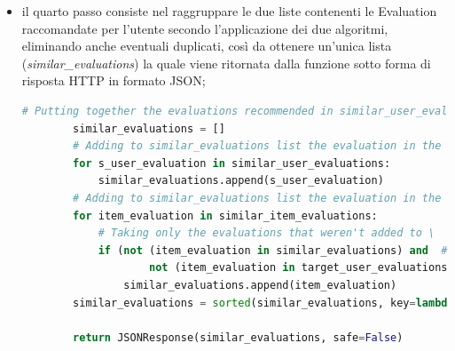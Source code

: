 \begin{itemize}
\begin{lstlisting}[language=Python, label=lst:CF_Hybrid_Evaluation_4]
                # Taking only the evaluations that have: different other_id (excluding the target evaluation
                # in the recommendation) and same parent_id and the evaluations that weren't added to 'similar_item_evaluations'
                # list or to 'similar_user_evaluations' or to 'target_user_evaluations'
                if ((t_user_evaluation['other_id'] != item_evaluation['other_id']) and # Evaluations must have different 'id'
                        (t_user_evaluation['parent_id'] == item_evaluation['parent_id']) and # Evaluations must have the same 'parent_id'
                        # Evaluation in all_other_evals list mustn't be already added to \
                        not (item_evaluation in similar_item_evaluations) and # the 'similar_item_evaluations' list,
                        not (item_evaluation in similar_user_evaluations) and # the 'similar_user_evaluations' list or
                        not (item_evaluation in target_user_evaluations)): # the 'target_user_evaluations' list
                    similar_item_evaluations.append(item_evaluation)
    \end{lstlisting} 
    \item il quarto passo consiste nel raggruppare le due liste contenenti le Evaluation raccomandate per l'utente secondo l'applicazione dei 
    due algoritmi, eliminando anche eventuali duplicati, così da ottenere un'unica lista (\textit{similar\_evaluations}) la quale viene ritornata dalla 
    funzione sotto forma di risposta HTTP in formato JSON;
    \begin{lstlisting}[language=Python, label=lst:CF_Hybrid_Evaluation_5]
        # Putting together the evaluations recommended in similar_user_evaluations list and similar_item_evaluations list
        similar_evaluations = []
        # Adding to similar_evaluations list the evaluation in the similar_user_evaluations list
        for s_user_evaluation in similar_user_evaluations:
            similar_evaluations.append(s_user_evaluation)
        # Adding to similar_evaluations list the evaluation in the similar_item_evaluations list
        for item_evaluation in similar_item_evaluations:
            # Taking only the evaluations that weren't added to \
            if (not (item_evaluation in similar_evaluations) and  # the 'similar_evaluations' list or
                    not (item_evaluation in target_user_evaluations)):  # the 'target_user_evaluations' list
                similar_evaluations.append(item_evaluation)
        similar_evaluations = sorted(similar_evaluations, key=lambda i: i['other_id'])
        
        return JSONResponse(similar_evaluations, safe=False)
    \end{lstlisting} 
\end{itemize}

